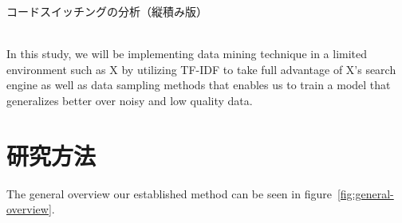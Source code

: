 \documentclass{jabstract}
\begin{document}
\begin{multicols}{2}
\begin{tablehere}
  \noindent
  \parbox{\linewidth}{
    \centering
    \caption{コードスイッチングの分析（縦積み版）}\label{tab:code_switch_vertical}
  }%
\end{tablehere}\\

In this study, we will be implementing data mining technique in a limited environment such as X by utilizing TF-IDF to take full advantage of X's search engine as well as data sampling methods that enables us to train a model that generalizes better over noisy and low quality data.

\section{研究方法}
The general overview our established method can be seen in figure~\ref{fig:general-overview}.


\end{multicols}
\end{document}
